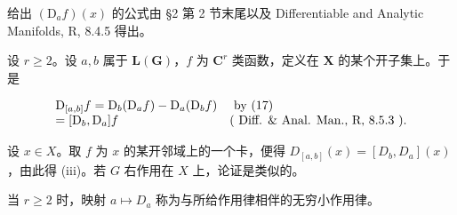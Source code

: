 给出 \((\mathrm{D}_a f)(x)\) 的公式由 §2 第 2 节末尾以及 Differentiable and Analytic Manifolds, R, 8.4.5 得出。

设 \(r \geqslant 2\)。设 \(a, b\) 属于 \(\mathbf{L}(\mathbf{G})\)，\(f\) 为 \(\mathbf{C}^r\) 类函数，定义在 \(\mathbf{X}\) 的某个开子集上。于是

\[
\begin{array}{l l} \mathrm{D} _ {[ a, b ]} f = \mathrm{D} _ {b} (\mathrm{D} _ {a} f) - \mathrm{D} _ {a} (\mathrm{D} _ {b} f) & \text { by   (17) } \\ = [ \mathrm{D} _ {b}, \mathrm{D} _ {a} ] f & (\text { Diff.   \&   Anal.   Man.,   R,   8.5.3 }). \end{array}
\]

设 \(x \in X\)。取 \(f\) 为 \(x\) 的某开邻域上的一个卡，便得 \(D_{[a,b]}(x) = [D_b, D_a](x)\)，由此得 (iii)。若 \(G\) 右作用在 \(X\) 上，论证是类似的。

当 \(r \geqslant 2\) 时，映射 \(a \mapsto D_{a}\) 称为与所给作用律相伴的无穷小作用律。

